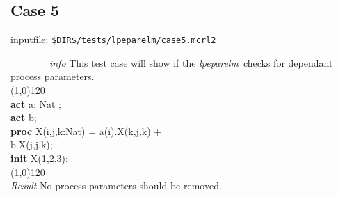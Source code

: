 \documentclass[a4paper,10pt]{article}
\theoremstyle{plain}
\theoremstyle{definition}
\newcommand{\tool}{\textit{lpeparelm}}
\newcommand{\ti}{\textit}
\newcommand{\tb}{\textbf}
\newcommand{\pps}{process parameters}
\newcommand{\tabw}{\hspace*{15.mm} \= \hspace*{20.mm} \= \hspace*{5.mm} \= \hspace*{5.mm} \= \hspace*{5.mm} \= \hspace*{5.mm}  \= \hspace*{5.mm}  \= \hspace*{5.mm}  \= \hspace*{5.mm} \= \hspace*{5.mm} \= \hspace*{5.mm}  \= \hspace*{5.mm}  \= \hspace*{5.mm}\kill}
\begin{document}
\subsection*{Case 5}
inputfile: \verb"$DIR$/tests/lpeparelm/case5.mcrl2"
\begin{tabbing}
\tabw
\ti{info} \> This test case will show if the \tool\ checks for dependant \pps .\\
\line(1,0){120}\\
\tb{act} \> a: Nat ; \\
\tb{act} \> b; \\
\tb{proc} \> X(i,j,k:Nat) = \> a(i).X(k,j,k) + \\
          \> \>              b.X(j,j,k);\\
\tb{init} \> X(1,2,3); \\  
\line(1,0){120}\\
\ti{Result} \> No process parameters should be removed.\\ 
\end{tabbing}
\end{document}
